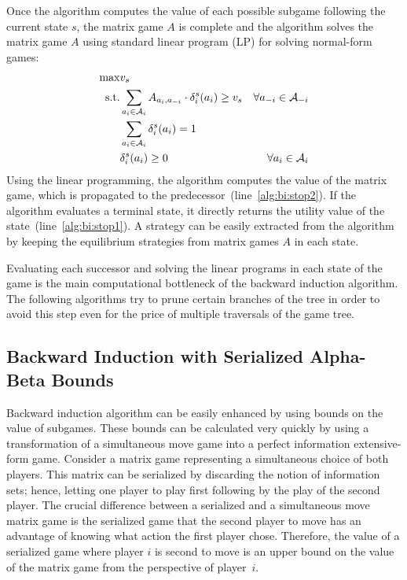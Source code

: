 Once the algorithm computes the value of each possible subgame following the current state $s$, the matrix game $A$ is complete and the algorithm solves the matrix game $A$ using standard linear program (LP) for solving normal-form games:
\begin{eqnarray}
\max & v_s & \\
\textrm{s.t.} & \sum_{a_i \in \mathcal{A}_{i}}A_{a_i,a_{-i}} \cdot \delta^{s}_i(a_i) \geq v_s & \forall a_{-i} \in \mathcal{A}_{-i}\\
& \sum_{a_{i} \in \mathcal{A}_{i}} \delta^{s}_{i}(a_{i}) = 1 \\
& \delta^{s}_{i}(a_{i}) \geq 0 & \forall a_{i} \in \mathcal{A}_{i} 
\end{eqnarray}
Using the linear programming, the algorithm computes the value of the matrix game, which is propagated to the predecessor~(line~\ref{alg:bi:stop2}). 
If the algorithm evaluates a terminal state, it directly returns the utility value of the state~(line~\ref{alg:bi:stop1}).
A strategy can be easily extracted from the algorithm by keeping the equilibrium strategies from matrix games $A$ in each state.

Evaluating each successor and solving the linear programs in each state of the game is the main computational bottleneck of the backward induction algorithm. 
The following algorithms try to prune certain branches of the tree in order to avoid this step even for the price of multiple traversals of the game tree.

\subsection{Backward Induction with Serialized Alpha-Beta Bounds}\label{sec:algs:biab}

Backward induction algorithm can be easily enhanced by using bounds on the value of subgames. 
These bounds can be calculated very quickly by using a transformation of a simultaneous move game into a perfect information extensive-form game.
Consider a matrix game representing a simultaneous choice of both players.
This matrix can be serialized by discarding the notion of information sets; hence, letting one player to play first following by the play of the second player. 
The crucial difference between a serialized and a simultaneous move matrix game is the serialized game that the second player to move has an advantage of knowing 
what action the first player chose. 
Therefore, the value of a serialized game where player $i$ is second to move is an upper bound on the value of the matrix game from the perspective of player~$i$. 

